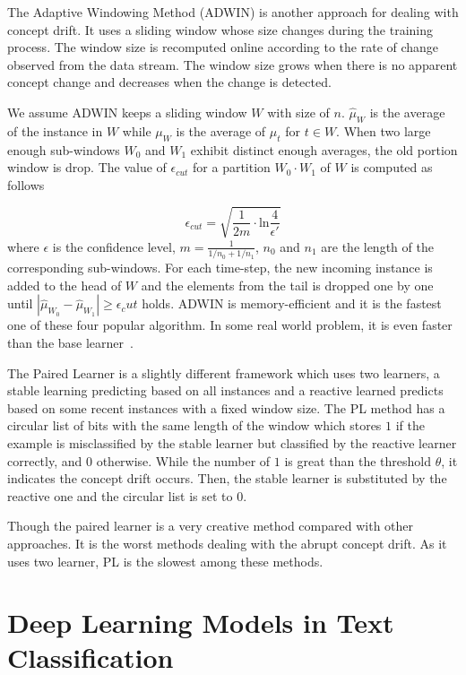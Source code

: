 The Adaptive Windowing Method (ADWIN) is another approach for dealing with concept drift. It uses a sliding window whose size changes during the training process. The window size is recomputed online according to the rate of change observed from the data stream. The window size grows when there is no apparent concept change and decreases when the change is detected.

We assume ADWIN keeps a sliding window $W$ with size of $n$. $\hat{\mu}_W$ is the average of the instance in $W$ while $\mu_W$ is the average of $\mu_t$ for $t \in W$. When two large enough sub-windows $W_0$ and $W_1$ exhibit distinct enough averages, the old portion window is drop. The value of $\epsilon_{cut}$ for a partition $W_0 \cdot W_1$ of $W$ is computed as follows

\begin{equation}
\epsilon_{cut} = \sqrt{\frac{1}{2m} \cdot \mbox{ln} \frac{4}{\epsilon'}}
\end{equation} 
where $\epsilon$ is the confidence level, $m = \frac{1}{1/n_0 + 1/n_1}$, $n_0$ and $n_1$ are the length of the corresponding sub-windows. For each time-step, the new incoming instance is added to the head of $W$ and the elements from the tail is dropped one by one until $|\hat{\mu}_{W_0} - \hat{\mu}_{W_1}| \geq \epsilon_cut$ holds. ADWIN is memory-efficient and it is the fastest one of these four popular algorithm. In some real world problem, it is even faster than the base learner~\cite{Goncalves2014}. 

The Paired Learner is a slightly different framework which uses two learners, a stable learning predicting based on all instances and a reactive learned predicts based on some recent instances with a fixed window size. The PL method has a circular list of bits with the same length of the window which stores $1$ if the example is misclassified by the stable learner but classified by the reactive learner correctly, and $0$ otherwise.
While the number of $1$ is great than the threshold $\theta$, it indicates the concept drift occurs. Then, the stable learner is substituted by the reactive one and the circular list is set to $0$. 

Though the paired learner is a very creative method compared with other approaches. It is the worst methods dealing with the abrupt concept drift. As it uses two learner, PL is the slowest among these methods.

\section{Deep Learning Models in Text Classification}

